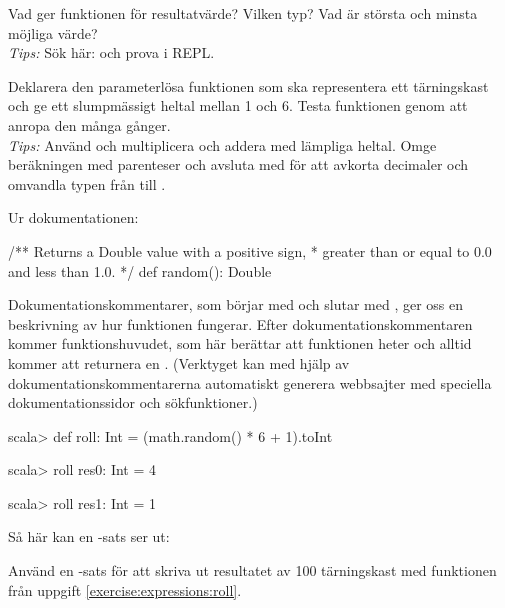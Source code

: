 \QUESTEND



\QUESTBEGIN

\Task\label{exercise:expressions:roll} \what

\Subtask Vad ger funktionen  för resultatvärde? Vilken typ? Vad är största och minsta möjliga värde?
\\\emph{Tips:} Sök här: \Scaladoc och prova i REPL.

\Subtask Deklarera den parameterlösa funktionen  som ska representera ett tärningskast och ge ett slumpmässigt heltal mellan 1 och 6. Testa funktionen genom att anropa den många gånger. \\\emph{Tips:} Använd  och multiplicera och addera med lämpliga heltal. Omge beräkningen med parenteser och avsluta med  för att avkorta decimaler och omvandla typen från  till .

\SOLUTION

\TaskSolved \what

\SubtaskSolved Ur dokumentationen:
\begin{Code}
/** Returns a Double value with a positive sign,
 *  greater than or equal to 0.0 and less than 1.0.
 */
def random(): Double
\end{Code}
Dokumentationskommentarer, som börjar med \code{/**} och slutar med \code{*/}, ger oss en beskrivning av hur funktionen fungerar. Efter dokumentationskommentaren kommer funktionshuvudet, som här berättar att funktionen heter  och alltid kommer att returnera en . (Verktyget  kan med hjälp av  dokumentationskommentarerna automatiskt generera webbsajter med speciella  dokumentationssidor och sökfunktioner.)

\SubtaskSolved
\begin{REPL}
scala> def roll: Int = (math.random() * 6 + 1).toInt

scala> roll
res0: Int = 4

scala> roll
res1: Int = 1
\end{REPL}

\QUESTEND





\QUESTBEGIN

\Task \what

\Subtask Så här kan en -sats ser ut:
Använd en -sats för att skriva ut resultatet av 100 tärningskast med funktionen  från uppgift \ref{exercise:expressions:roll}.

